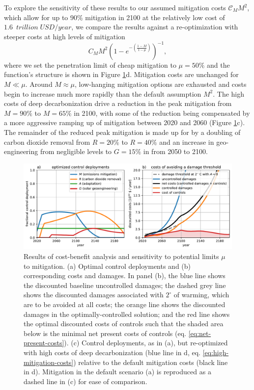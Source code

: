 \documentclass[9pt,twocolumn,twoside,lineno]{pnas-new}
\begin{document}
To explore the sensitivity of these results to our assumed mitigation costs $\mathcal{C}_{M} M^{2}$, which allow for up to $90\%$ mitigation in 2100 at the relatively low cost of $\SI{1.6}{\;trillion\; USD/year}$, we compare the results against a re-optimization with steeper costs at high levels of mitigation
\begin{equation}
    C_{M}M^{2} \left( 1 - e^{-\left(\frac{1-M}{1-\mu}\right)} \right)^{-1},
    \label{eq:high-mitigation-costs}
\end{equation}
where we set the penetration limit of cheap mitigation to $\mu = 50\%$ and the function's structure is shown in Figure \ref{fig:cost-effectiveness}d. Mitigation costs are unchanged for $M \ll \mu$. Around $M \approx \mu$, low-hanging mitigation options are exhausted and costs begin to increase much more rapidly than the default assumption $M^{2}$. The high costs of deep decarbonization drive a reduction in the peak mitigation from $M=90\%$ to $M=65\%$ in 2100, with some of the reduction being compensated by a more aggressive ramping up of mitigation between 2020 and 2060 (Figure \ref{fig:cost-effectiveness}c). The remainder of the reduced peak mitigation is made up for by a doubling of carbon dioxide removal from $R=20\%$ to $R=40\%$ and an increase in geo-engineering from negligible levels to $G=15\%$ in from 2050 to 2100.


\begin{figure}%
\centering
\includegraphics[width=11.4cm]{figures/default-temp_controls_and_damages.pdf}
\caption{Results of cost-benefit analysis and sensitivity to potential limits $\mu$ to mitigation. (a) Optimal control deployments and (b) corresponding costs and damages. In panel (b), the blue line shows the discounted baseline uncontrolled damages; the dashed grey line shows the discounted damages associated with $2^{\circ}$ of warming, which are to be avoided at all costs; the orange line shows the discounted damages in the optimally-controlled solution; and the red line shows the optimal discounted costs of controls such that the shaded area below is the minimal net present costs of controls (eq. \ref{eq:net-present-costs}). (c) Control deployments, as in (a), but re-optimized with high costs of deep decarbonization (blue line in d, eq. \ref{eq:high-mitigation-costs}) relative to the default mitigation costs (black line in d). Mitigation in the default scenario (a) is reproduced as a dashed line in (c) for ease of comparison.}
\label{fig:cost-effectiveness}
\end{figure}
\end{document}
